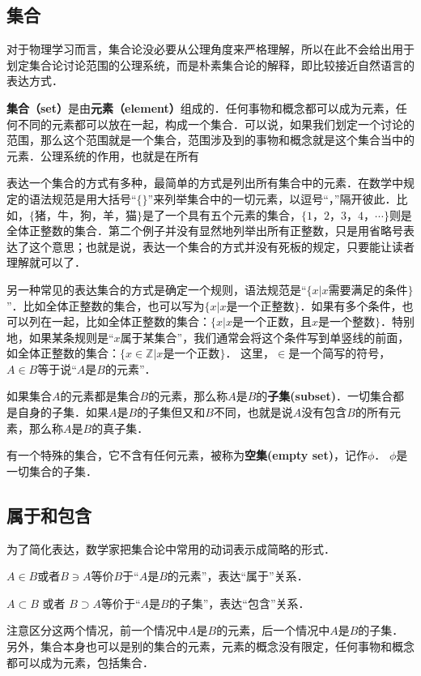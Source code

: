 \subsection{集合}

对于物理学习而言，集合论没必要从公理角度来严格理解，所以在此不会给出用于划定集合论讨论范围的公理系统，而是朴素集合论的解释，即比较接近自然语言的表达方式．

\textbf{集合（set）}是由\textbf{元素（element）}组成的．任何事物和概念都可以成为元素，任何不同的元素都可以放在一起，构成一个集合．可以说，如果我们划定一个讨论的范围，那么这个范围就是一个集合，范围涉及到的事物和概念就是这个集合当中的元素．公理系统的作用，也就是在所有

表达一个集合的方式有多种，最简单的方式是列出所有集合中的元素．在数学中规定的语法规范是用大括号“$\{\}$”来列举集合中的一切元素，以逗号“，”隔开彼此．比如，$\{$猪，牛，狗，羊，猫$\}$是了一个具有五个元素的集合，$\{1，2，3，4，⋯\}$则是全体正整数的集合．第二个例子并没有显然地列举出所有正整数，只是用省略号表达了这个意思；也就是说，表达一个集合的方式并没有死板的规定，只要能让读者理解就可以了．

另一种常见的表达集合的方式是确定一个规则，语法规范是“$\{$$x|x$需要满足的条件$\}$”．比如全体正整数的集合，也可以写为$\{$$x|x$是一个正整数$\}$．如果有多个条件，也可以列在一起，比如全体正整数的集合：$\{$$x|x$是一个正数，且$x$是一个整数$\}$．特别地，如果某条规则是“$x$属于某集合”，我们通常会将这个条件写到单竖线的前面，如全体正整数的集合：$\{$$x∈\mathbb{Z}|x$是一个正数$\}$． 这里，$∈$是一个简写的符号，$A∈ B$等于说“$A$是$B$的元素”．

如果集合$A$的元素都是集合$B$的元素，那么称$A$是$B$的\textbf{子集(subset)}．一切集合都是自身的子集．如果$A$是$B$的子集但又和$B$不同，也就是说$A$没有包含$B$的所有元素，那么称$A$是$B$的真子集．

有一个特殊的集合，它不含有任何元素，被称为\textbf{空集(empty set)}，记作$\phi$． $\phi $是一切集合的子集．

\subsection{属于和包含}
为了简化表达，数学家把集合论中常用的动词表示成简略的形式．

$A∈B$或者$B\ni A$等价$B$于“$A$是$B$的元素”，表达“属于”关系． 

$A⊂B$ 或者 $B⊃ A$等价于“$A$是$B$的子集”，表达“包含”关系． 

注意区分这两个情况，前一个情况中$A$是$B$的元素，后一个情况中$A$是$B$的子集．另外，集合本身也可以是别的集合的元素，元素的概念没有限定，任何事物和概念都可以成为元素，包括集合．

